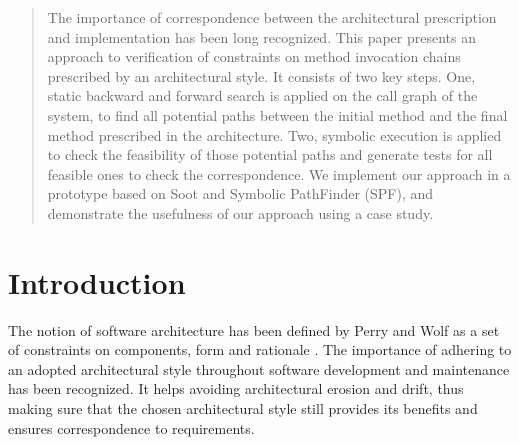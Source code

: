 \documentclass{acm_proc_article-sp}
\begin{document}
\maketitle
\begin{abstract}
The importance of correspondence between the architectural
prescription and implementation has been long recognized.  This paper
presents an approach to verification of constraints on method
invocation chains prescribed by an architectural style.  It consists
of two key steps. One, static backward and forward search is applied
on the call graph of the system, to find all potential paths between
the initial method and the final method prescribed in the
architecture. Two, symbolic execution is applied to check the
feasibility of those potential paths and generate tests for all
feasible ones to check the correspondence.
We implement our approach in a prototype based on Soot and Symbolic
PathFinder (SPF), and demonstrate the usefulness of our approach using
a case study.
\end{abstract}


\section{Introduction}
\label{sec:intro}
The notion of software architecture has been defined by Perry and Wolf
as a set of constraints on components, form and rationale
\cite{Perry:1992}. The importance of adhering to an adopted
architectural style throughout software development and maintenance
has been recognized. It helps avoiding architectural erosion and
drift, thus making sure that the chosen architectural style still
provides its benefits and ensures correspondence to requirements.
\end{document}
